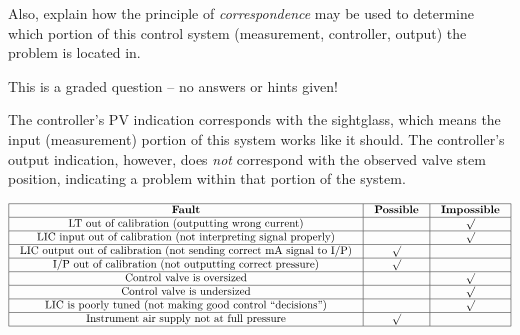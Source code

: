 Also, explain how the principle of {\it correspondence} may be used to determine which portion of this control system (measurement, controller, output) the problem is located in.

\vfil 

\eject






This is a graded question -- no answers or hints given!







The controller's PV indication corresponds with the sightglass, which means the input (measurement) portion of this system works like it should.  The controller's output indication, however, does {\it not} correspond with the observed valve stem position, indicating a problem within that portion of the system.


$$\vbox{\offinterlineskip
\halign{\strut
\vrule \quad\hfil # \ \hfil & 
\vrule \quad\hfil # \ \hfil & 
\vrule \quad\hfil # \ \hfil \vrule \cr
\noalign{\hrule}
%
{\bf Fault} & {\bf Possible} & {\bf Impossible} \cr
%
\noalign{\hrule}
%
LT out of calibration (outputting wrong current) &  & $\surd$ \cr
%
\noalign{\hrule}
%
LIC input out of calibration (not interpreting signal properly) &  & $\surd$ \cr
%
\noalign{\hrule}
%
LIC output out of calibration (not sending correct mA signal to I/P) & $\surd$ &  \cr
%
\noalign{\hrule}
%
I/P out of calibration (not outputting correct pressure) & $\surd$ &  \cr
%
\noalign{\hrule}
%
Control valve is oversized &  & $\surd$ \cr
%
\noalign{\hrule}
%
Control valve is undersized &  & $\surd$ \cr
%
\noalign{\hrule}
%
LIC is poorly tuned (not making good control ``decisions'') &  & $\surd$ \cr
%
\noalign{\hrule}
%
Instrument air supply not at full pressure & $\surd$ &  \cr
%
\noalign{\hrule}
} %
}$$ %




